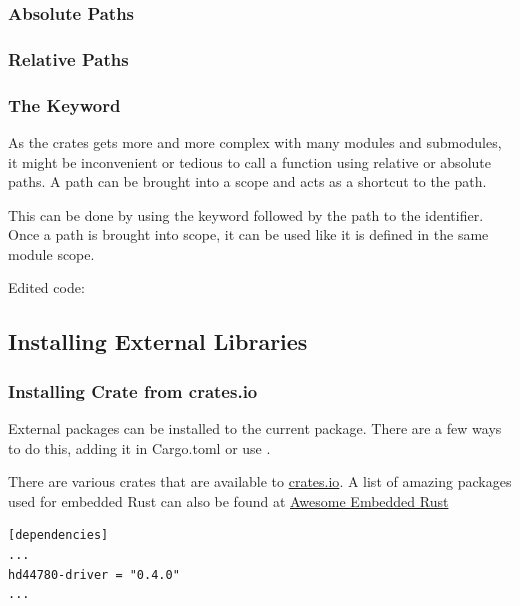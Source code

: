 \documentclass{beamer}
\begin{document}
\begin{frame}
  \frametitle{Absolute Paths}
  
  
\end{frame}

\begin{frame}
  \frametitle{Relative Paths}
  
  
  
\end{frame}

\begin{frame}
  \frametitle{The  Keyword}
  As the crates gets more and more complex with many modules and submodules, it might be inconvenient or tedious to call a function using relative or absolute paths. A path can be brought into a scope and acts as a shortcut to the path.

  This can be done by using the  keyword followed by the path to the identifier. Once a path is brought into scope, it can be used like it is defined in the same module scope.
  

  Edited code:
  
\end{frame}

\subsection{Installing External Libraries}
\begin{frame}[fragile]
  \frametitle{Installing Crate from crates.io}
  External packages can be installed to the current package. There are a few ways to do this, adding it in Cargo.toml or use .

  There are various crates that are available to \href{crates.io}{crates.io}. A list of amazing packages used for embedded Rust can also be found at \href{https://github.com/rust-embedded/awesome-embedded-rust}{Awesome Embedded Rust}

\begin{lstlisting}[caption={Adding Dependencies in Cargo.toml}]
[dependencies]
...
hd44780-driver = "0.4.0"
...
\end{lstlisting}
\end{frame}
\end{document}
